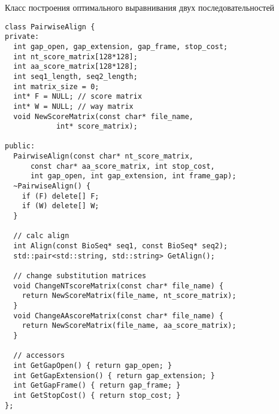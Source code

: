 \begin{algorithm}[H]
	\caption{Класс построения оптимального выравнивания двух последовательностей} \label{lst:PairwiseAligner}
	\begin{lstlisting}
class PairwiseAlign {
private:
  int gap_open, gap_extension, gap_frame, stop_cost;
  int nt_score_matrix[128*128];
  int aa_score_matrix[128*128];
  int seq1_length, seq2_length; 
  int matrix_size = 0;
  int* F = NULL; // score matrix
  int* W = NULL; // way matrix
  void NewScoreMatrix(const char* file_name, 
  			int* score_matrix);

public:
  PairwiseAlign(const char* nt_score_matrix, 
      const char* aa_score_matrix, int stop_cost, 
      int gap_open, int gap_extension, int frame_gap);
  ~PairwiseAlign() { 
  	if (F) delete[] F; 
  	if (W) delete[] W; 
  }
  
  // calc align 
  int Align(const BioSeq* seq1, const BioSeq* seq2);
  std::pair<std::string, std::string> GetAlign();
  
  // change substitution matrices
  void ChangeNTscoreMatrix(const char* file_name) {
    return NewScoreMatrix(file_name, nt_score_matrix);
  }
  void ChangeAAscoreMatrix(const char* file_name) {
    return NewScoreMatrix(file_name, aa_score_matrix);
  }
  
  // accessors
  int GetGapOpen() { return gap_open; } 
  int GetGapExtension() { return gap_extension; } 
  int GetGapFrame() { return gap_frame; } 
  int GetStopCost() { return stop_cost; } 
};
	\end{lstlisting}
\end{algorithm}

